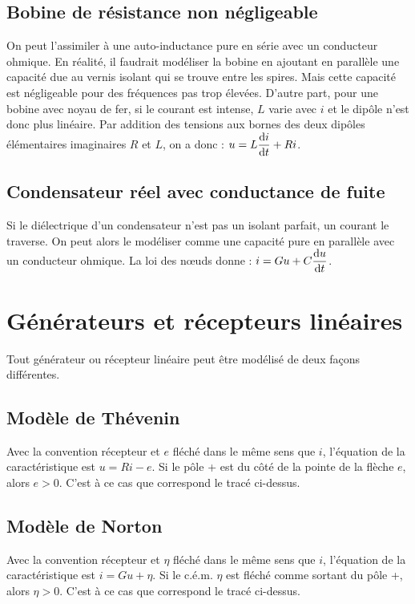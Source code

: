 \subsection{Bobine de résistance non négligeable}

On peut l'assimiler à une auto-inductance pure en série avec un conducteur ohmique. En réalité, il faudrait modéliser la bobine en ajoutant en parallèle une capacité due au vernis isolant qui se trouve entre les spires. Mais cette capacité est négligeable pour des fréquences pas trop élevées. D'autre part, pour une bobine avec noyau de fer, si le courant est intense, $L$ varie avec $i$ et le dipôle n'est donc plus linéaire. Par addition des tensions aux bornes des deux dipôles élémentaires imaginaires $R$ et $L$, on a donc : $u = L\dfrac{\mathrm{d} i}{\mathrm{d} t} + Ri$.

\subsection{Condensateur réel avec conductance de fuite}

Si le diélectrique d'un condensateur n'est pas un isolant parfait, un courant le traverse. On peut alors le modéliser comme une capacité pure en parallèle avec un conducteur ohmique.
La loi des nœuds donne : $i = Gu + C \dfrac{\mathrm{d} u}{\mathrm{d} t}$.

\section{Générateurs et récepteurs linéaires}

Tout générateur ou récepteur linéaire peut être modélisé de deux façons différentes.

\subsection{Modèle de Thévenin}

Avec la convention récepteur et $e$ fléché dans le même sens que $i$, l'équation de la caractéristique est $u=Ri-e$. Si le pôle + est du côté de la pointe de la flèche $e$, alors $e > 0$. C'est à ce cas que correspond le tracé ci-dessus.

\subsection{Modèle de Norton}

Avec la convention récepteur et $\eta$ fléché dans le même sens que $i$, l'équation de la caractéristique est $i=Gu+\eta$. Si le c.é.m. $\eta$ est fléché comme sortant du pôle +, alors $\eta > 0$. C'est à ce cas que correspond le tracé ci-dessus.

